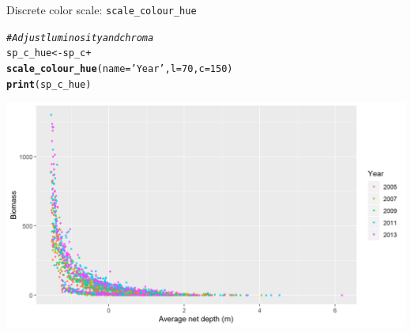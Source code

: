 \documentclass{beamer}\usepackage[]{graphicx}\usepackage[]{color}
\makeatletter
\newcommand{\hlnum}[1]{\textcolor[rgb]{0.686,0.059,0.569}{#1}}%
\newcommand{\hlstr}[1]{\textcolor[rgb]{0.192,0.494,0.8}{#1}}%
\newcommand{\hlcom}[1]{\textcolor[rgb]{0.678,0.584,0.686}{\textit{#1}}}%
\newcommand{\hlopt}[1]{\textcolor[rgb]{0,0,0}{#1}}%
\newcommand{\hlstd}[1]{\textcolor[rgb]{0.345,0.345,0.345}{#1}}%
\newcommand{\hlkwb}[1]{\textcolor[rgb]{0.69,0.353,0.396}{#1}}%
\newcommand{\hlkwc}[1]{\textcolor[rgb]{0.333,0.667,0.333}{#1}}%
\newcommand{\hlkwd}[1]{\textcolor[rgb]{0.737,0.353,0.396}{\textbf{#1}}}%
\newenvironment{kframe}{%
 \def\at@end@of@kframe{}%
 \ifinner\ifhmode%
  \def\at@end@of@kframe{\end{minipage}}%
  \begin{minipage}{\columnwidth}%
 \fi\fi%
 \def\FrameCommand##1{\hskip\@totalleftmargin \hskip-\fboxsep
 \colorbox{shadecolor}{##1}\hskip-\fboxsep
     \hskip-\linewidth \hskip-\@totalleftmargin \hskip\columnwidth}%
 \MakeFramed {\advance\hsize-\width
   \@totalleftmargin\z@ \linewidth\hsize
   \@setminipage}}%
 {\par\unskip\endMakeFramed%
 \at@end@of@kframe}
\newenvironment{knitrout}{}{} %
\makeatother
\begin{document}
\begin{frame}[fragile]{Discrete color scale: \lstinline{scale_colour_hue}}
\begin{knitrout}\footnotesize
{}\color{fgcolor}\begin{kframe}
\begin{alltt}
\hlcom{# Adjust luminosity and chroma}
\hlstd{sp_c_hue} \hlkwb{<-} \hlstd{sp_c} \hlopt{+}
  \hlkwd{scale_colour_hue}\hlstd{(}\hlkwc{name}\hlstd{=}\hlstr{'Year'}\hlstd{,} \hlkwc{l}\hlstd{=}\hlnum{70}\hlstd{,} \hlkwc{c}\hlstd{=}\hlnum{150}\hlstd{)}
\hlkwd{print}\hlstd{(sp_c_hue)}
\end{alltt}
\end{kframe}

{\centering \includegraphics[width=.9\linewidth]{figure/sp_discrete_color_hue1-1} 

}



\end{knitrout}
\end{frame}
\end{document}
